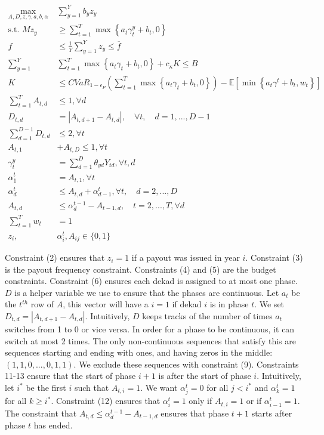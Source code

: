 \documentclass[11pt]{article}
\begin{document}
    \begin{align}
      \max_{A,D,z,\gamma,a,b,\alpha} &\sum_{y=1}^{Y} b_y z_y \\
        \text{s.t.   } Mz_y &\geq \sum_{t=1}^{T} \max \left \{a_t \gamma_t^y + b_t,0 \right \}\\
        \underline{f} &\leq \frac{1}{Y} \sum_{y=1}^{Y} z_y \leq \overline{f}\\
        \sum_{y=1}^{Y} & \sum_{t=1}^{T} \max \left \{a_t \gamma_t + b_t,0 \right \} + c_{\kappa}K \leq B\\
        K &\leq CVaR_{1-\epsilon_P} \left ( \sum_{t=1}^{T} \max \left \{ a_t \gamma_t + b_t,0 \right \} \right ) - \mathbb{E} \left [ \min \left \{ a_t \gamma^t +b_t, w_t \right \} \right ]\\
        \sum_{t=1}^{T} A_{t,d} &\leq 1, \forall d \\ 
        D_{t,d} &= |A_{t,d+1}-A_{t,d}|, \quad \forall t, \quad d=1,...,D-1\\
        \sum_{d=1}^{D-1} D_{t,d} &\leq 2, \forall t \\
        A_{t,1} &+ A_{t,D} \leq 1, \forall t \\
        \gamma_t^y &= \sum_{d=1}^{D} \theta_{yd}Y_{td}, \forall t,d \\
        \alpha^t_1 &= A_{t,1}, \forall t \\
        \alpha^t_d &\leq A_{t,d} + \alpha^t_{d-1}, \forall t, \quad d=2,...,D\\
        A_{t,d} &\leq \alpha^{t-1}_d - A_{t-1,d}, \quad t=2,...,T, \forall d\\
        \sum_{t=1}^T w_t &= 1\\
        z_i, & \alpha^t_i, A_{ij} \in \{ 0,1\}
    \end{align}

    Constraint (2) ensures that $z_i = 1$ if a payout was issued in year $i$. Constraint (3) is the payout frequency constraint. Constraints (4) and (5) are the budget constraints. Constraint (6) ensures each dekad is assigned to at most one phase. $D$ is a helper variable we use to ensure that the phases are continuous. Let $a_t$ be the $t^{th}$ row of $A$, this vector will have a $i=1$ if dekad $i$ is in phase $t$. We set $D_{t,d} = |A_{t,d+1}-A_{t,d}|$. Intuitively, $D$ keeps tracks of the number of times $a_t$ switches from 1 to 0 or vice versa. In order for a phase to be continuous, it can switch at most 2 times. The only non-continuous sequences that satisfy this are sequences starting and ending with ones, and having zeros in the middle: $(1,1,0,...,0,1,1)$. We exclude these sequences with constraint (9). Constraints 11-13 ensure that the start of phase $i+1$ is after the start of phase $i$. Intuitively, let $i^*$ be the first $i$ such that $A_{t,i} = 1$. We want $\alpha^t_j = 0$ for all $j < i^*$ and $\alpha^t_k = 1$ for all $k \geq i^*$. Constraint (12) ensures that $\alpha^t_i = 1$ only if $A_{t,i}=1$ or if $\alpha^t_{i-1} = 1$. The constraint that $A_{t,d} \leq \alpha^{t-1}_d - A_{t-1,d}$ ensures that phase $t+1$ starts after phase $t$ has ended. 
\end{document}
